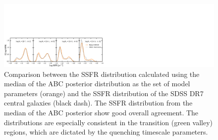 \begin{figure}
\begin{center}
\includegraphics[width=\textwidth] {figs/cenq/SSFR_ABC_posterior_RHOssfrfq_TinkerFq_Std_updated_prior.pdf}
\caption{Comparison between the SSFR distribution calculated using the 
median of the ABC posterior distribution as the set of model parameters (orange)
and the SSFR distribution of the SDSS DR7 central galaxies (black dash). The SSFR 
distribution from the median of the ABC posterior show good overall agreement. The 
distributions are especially consistent in the transition (green valley) regions, 
which are dictated by the quenching timescale parameters.}
\label{fig:abc_ssfr}
\end{center}
\end{figure}

